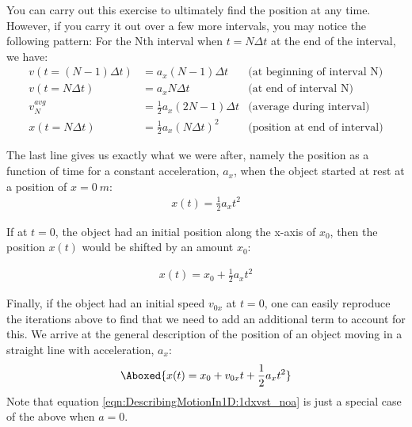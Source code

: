 You can carry out this exercise to ultimately find the position at any time. However, if you carry it out over a few more intervals, you may notice the following pattern: For the Nth interval when $t=N\Delta t$ at the end of the interval, we have:
\begin{align*}
v(t=(N-1)\Delta t) &= a_x (N-1) \Delta t &\text{(at beginning of interval N)}\\
v(t=N\Delta t) &= a_x N \Delta t &\text{(at end of interval N)}\\
v_N^{avg}&=\frac{1}{2}a_x(2N-1)\Delta t&\text{(average during interval)}\\
x(t=N\Delta t)&=\frac{1}{2}a_x(N\Delta t)^2&\text{(position at end of interval)}
\end{align*}

The last line gives us exactly what we were after, namely the position as a function of time for a constant acceleration, $a_x$, when the object started at rest at a position of $x=\SI{0}{m}$:
\begin{align}
\label{eqn:DescribingMotionIn1D:1dxoft_novonoxo}
 x(t) = \frac{1}{2} a_x t^2
\end{align}

If at $t=0$, the object had an initial position along the x-axis of $x_0$, then the position $x(t)$ would be shifted by an amount $x_0$:

\begin{align}
\label{eqn:DescribingMotionIn1D:1dxoft_novo}
 x(t) = x_0+\frac{1}{2} a_x t^2
\end{align}

Finally, if the object had an initial speed $v_{0x}$ at $t=0$, one can easily reproduce the iterations above to find that we need to add an additional term to account for this. We arrive at the general description of the position of an object moving in a straight line with acceleration, $a_x$:
\begin{align}
\label{eqn:DescribingMotionIn1D:1dxvst}
\Aboxed{ x(t) = x_0+v_{0x}t+ \frac{1}{2}a_xt^2}
\end{align}
Note that equation \ref{eqn:DescribingMotionIn1D:1dxvst_noa} is just a special case of the above when $a=0$. 


